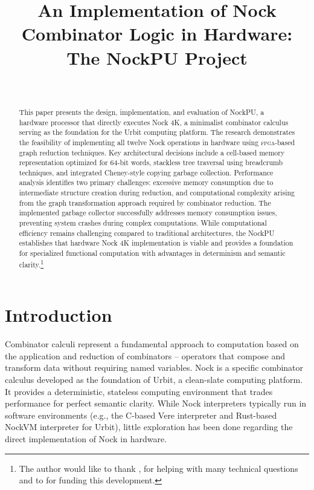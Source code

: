 \documentclass[twoside]{article}
\title{An Implementation of Nock Combinator Logic in Hardware: The NockPU Project}
\author{\authorpatp \\ \affiliation}
\date{}
\begin{document}
\maketitle
\thispagestyle{firststyle}

\begin{abstract}
\sloppy
This paper presents the design, implementation, and evaluation of NockPU, a hardware processor that directly executes Nock 4K, a minimalist combinator calculus serving as the foundation for the Urbit computing platform. The research demonstrates the feasibility of implementing all twelve Nock operations in hardware using \textsc{fpga}-based graph reduction techniques. Key architectural decisions include a cell-based memory representation optimized for 64-bit words, stackless tree traversal using breadcrumb techniques, and integrated Cheney-style copying garbage collection. Performance analysis identifies two primary challenges: excessive memory consumption due to intermediate structure creation during reduction, and computational complexity arising from the graph transformation approach required by combinator reduction. The implemented garbage collector successfully addresses memory consumption issues, preventing system crashes during complex computations. While computational efficiency remains challenging compared to traditional architectures, the NockPU establishes that hardware Nock 4K implementation is viable and provides a foundation for specialized functional computation with advantages in determinism and semantic clarity.\footnote{The author would like to thank {}, {} for helping with many technical questions and to {} for funding this development.}
\end{abstract}

\setcounter{page}{99}

\tableofcontents

\section{Introduction}

\sloppy
Combinator calculi represent a fundamental approach to \mbox{computation} based on the application and reduction of combinators -- operators that compose and transform data without requiring named variables. Nock is a specific combinator calculus developed as the foundation of Urbit, a clean-slate computing platform. It provides a deterministic, stateless computing environment that trades performance for perfect semantic clarity. While Nock interpreters typically run in software environments (e.g., the C-based Vere interpreter and Rust-based NockVM interpreter for Urbit), little exploration has been done regarding the direct implementation of Nock in hardware.
\end{document}
